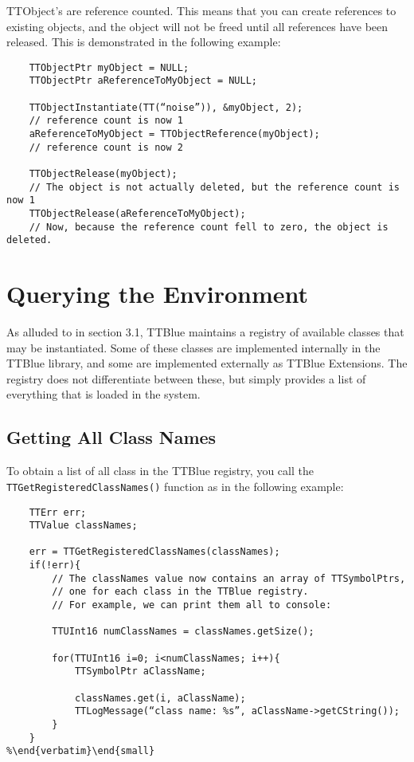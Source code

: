 TTObject’s are reference counted.  This means that you can create references to existing objects, and the object will not be freed until all references have been released.  This is demonstrated in the following example:

\begin{small}\begin{verbatim}
	TTObjectPtr myObject = NULL;
	TTObjectPtr aReferenceToMyObject = NULL;

	TTObjectInstantiate(TT(“noise”)), &myObject, 2);
	// reference count is now 1
	aReferenceToMyObject = TTObjectReference(myObject);
	// reference count is now 2

	TTObjectRelease(myObject);
	// The object is not actually deleted, but the reference count is now 1
	TTObjectRelease(aReferenceToMyObject);
	// Now, because the reference count fell to zero, the object is deleted.
\end{verbatim}\end{small}



\section{Querying the Environment}

As alluded to in section 3.1, TTBlue maintains a registry of available classes that may be instantiated.  Some of these classes are implemented internally in the TTBlue library, and some are implemented externally as TTBlue Extensions.  The registry does not differentiate between these, but simply provides a list of everything that is loaded in the system.


\subsection{Getting All Class Names}

To obtain a list of all class in the TTBlue registry, you call the \lstinline!TTGetRegisteredClassNames()! function as in the following example:

\begin{lstlisting}
	TTErr err;
	TTValue classNames;

	err = TTGetRegisteredClassNames(classNames);
	if(!err){
		// The classNames value now contains an array of TTSymbolPtrs, 
		// one for each class in the TTBlue registry.
		// For example, we can print them all to console:

		TTUInt16 numClassNames = classNames.getSize();

		for(TTUInt16 i=0; i<numClassNames; i++){
			TTSymbolPtr aClassName;

			classNames.get(i, aClassName);
			TTLogMessage(“class name: %s”, aClassName->getCString());
		}
	}
%\end{verbatim}\end{small}
\end{lstlisting}

